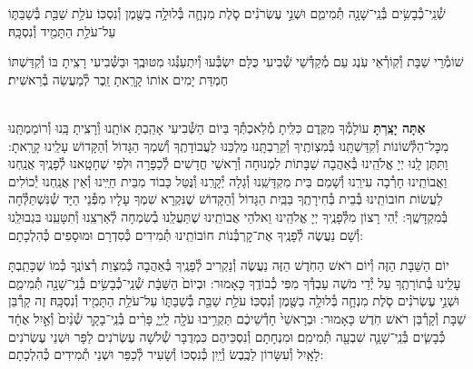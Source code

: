 \documentclass[twoside, openany, parskip=half, 11pt]{book}
\begin{document}
שְׁ֯נֵֽי־כְ֯בָשִׂ֥ים בְּ֯נֵֽי־שָׁנָ֖ה תְּ֯מִימִ֑ם וּשְׁנֵ֣י עֶשְׂרֹנִ֗ים סֹ֧לֶת מִנְחָ֛ה בְּ֯לוּלָ֥ה בַשֶּׁ֖מֶן וְ֯נִסְכּֽוֹ׃ עֹלַ֥ת שַׁבַּ֖ת בְּ֯שַׁבַּתּ֑וֹ עַל־עֹלַ֥ת הַתָּמִ֖יד וְ֯נִסְכָּֽהּ׃

שׁוֹמְ֯רֵי שַׁבָּת וְ֯קֽוֹרְ֯אֵי עֹֽנֶג עַם מְ֯קַדְּ֯שֵׁי שְׁ֯בִיעִי כֻּלָּם יִשְׂבְּ֯עוּ וְ֯יִתְעַנְּ֯גוּ מִטּוּבֶֽךָ וּבַשְּׁ֯בִיעִי רָצִֽיתָ בּוֹ וְ֯קִדַּשְׁתּוֹ חֶמְדַּת יָמִים אוֹתוֹ קָרָֽאתָ זֵֽכֶר לְ֯מַעֲשֵׂה בְ֯רֵאשִׁית׃

\shabboskiddushhayom{} 

\begin{sometimes}

\label{shabbosroshchodesh}
\\
\textbf{אַתָּה יָצַֽרְתָּ}
עוֹלָמְ֯ךָ מִקֶּֽדֶם כִּלִּֽיתָ מְ֯לַאכְתְּ֯ךָ בַּיוֹם הַשְּׁ֯בִיעִי אָהַֽבְתָּ אוֹתָֽנוּ וְ֯רָצִֽיתָ בָּֽנוּ וְ֯רוֹמַמְתָּֽנוּ מִכׇּל־הַלְּ֯שׁוֹנוֹת וְ֯קִדַּשְׁתָּֽנוּ בְּ֯מִצְוֹתֶֽיךָ וְ֯קֵרַבְתָּֽנוּ מַלְכֵּנוּ לַעֲבוֹדָתֶֽךָ וְ֯שִׁמְךָ הַגָּדוֹל וְ֯הַקָּדוֹשׁ עָלֵֽינוּ קָרָֽאתָ: וַתִּתֶּן לָֽנוּ יְיָ אֱלֹהֵֽינוּ בְּ֯אַהֲבָה שַׁבָּתוֹת לִמְנוּחָה וְ֯רָאשֵׁי חֳדָשִׁים לְ֯כַפָּרָה וּלְפִי שֶׁחָטָֽאנוּ לְ֯פָנֶֽיךָ אֲנַֽחְנוּ וַאֲבוֹתֵֽינוּ חָרְ֯בָה עִירֵֽנוּ וְ֯שָׁמֵם בֵּית מִקְדָּשֵֽׁנוּ וְ֯גָלָה יְ֯קָרֵֽנוּ וְ֯נֻּטַּל כָּבוֹד מִבֵּית חַיֵּֽינוּ וְ֯אֵין אֲנַֽחְנוּ יְ֯כוֹלִים לַעֲשׂוֹת חוֹבוֹתֵֽינוּ בְּ֯בֵית בְּ֯חִירָתֶֽךָ בַּבַּֽיִת הַגָּדוֹל וְ֯הַקָּדוֹשׁ שֶׁנִּקְרָא שִׁמְךָ עָלָיו מִפְּ֯נֵי הַיָּד שְׁ֯נִּשְׁתַּלְּ֯חָה בְּ֯מִקְדָּשֶֽׁךָ: יְ֯הִי רָצוֹן מִלְּ֯פָנֶֽיךָ יְיָ אֱלֹהֵֽינוּ וֵאלֹהֵי אֲבוֹתֵֽינוּ שֶׁתַּעֲלֵֽנוּ בְ֯שִׂמְחָה לְ֯אַרְצֵֽנוּ וְ֯תִטָּעֵֽנוּ בִּגְבוּלֵֽנוּ וְ֯שָׁם נַעֲשֶׂה לְ֯פָנֶֽיךָ אֶת־קׇרְבְּ֯נוֹת חוֹבוֹתֵֽינוּ תְּ֯מִידִים כְּ֯סִדְרָם וּמוּסָפִים כְּ֯הִלְכָתָם:

יוֹם הַשַּׁבָּת הַזֶּה וְ֯יוֹם רֹאשׁ הַחֹֽדֶשׁ הַזֶּה נַעֲשֶׂה וְ֯נַקְרִיב לְ֯פָנֶֽיךָ בְּ֯אַהֲבָה כְּ֯מִצְוַת רְ֯צוֹנֶֽךָ כְּ֯מוֹ שֶׁכָּתַֽבְתָּ עָלֵֽינוּ בְּ֯תוֹרָתֶֽךָ עַל יְ֯דֵי מֹשֶׁה עַבְדְּ֯ךָ מִפִּי כְ֯בוֹדֶֽךָ כָּאָמוּר: וּבְיוֹם֙ הַשַּׁבָּ֔ת שְׁ֯נֵֽי־כְ֯בָשִׂ֥ים בְּ֯נֵֽי־שָׁנָ֖ה תְּ֯מִימִ֑ם וּשְׁנֵ֣י עֶשְׂרֹנִ֗ים סֹ֧לֶת מִנְחָ֛ה בְּ֯לוּלָ֥ה בַשֶּׁ֖מֶן וְ֯נִסְכּֽוֹ׃ עֹלַ֥ת שַׁבַּ֖ת בְּ֯שַׁבַּתּ֑וֹ עַל־עֹלַ֥ת הַתָּמִ֖יד וְ֯נִסְכָּֽהּ׃ זֶה קָרְ֯בַּן שַׁבָּת וְ֯קָרְ֯בַּן רֹאשׁ חֹֽדֶשׁ כָּאָמוּר: וּבְרָאשֵׁי֙ חָדְ֯שֵׁיכֶ֔ם תַּקְרִ֥יבוּ עֹלָ֖ה לַֽיְיָ֑ פָּרִ֨ים בְּ֯נֵֽי־בָקָ֤ר שְׁ֯נַ֨יִם֙ וְ֯אַ֣יִל אֶחָ֔ד כְּ֯בָשִׂ֧ים בְּ֯נֵֽי־שָׁנָ֛ה שִׁבְעָ֖ה תְּ֯מִימִֽם׃ וּמִנְחָתָם וְ֯נִסְכֵּיהֶם כִּמְדֻבָּר שְׁ֯לֹשָׁה עֶשְׂרֹנִים לַפָּר וּשְׁנֵי עֶשְׂרֹנִים לָאָֽיִל וְ֯עִשָּׂרוֹן לַכֶּֽבֶשׂ וְ֯יַֽיִן כְּ֯נִסְכּוֹ וְ֯שָׂעִיר לְ֯כַפֵּר וּשְׁנֵי תְ֯מִידִים כְּ֯הִלְכָתָם:


\end{sometimes}
\end{document}
